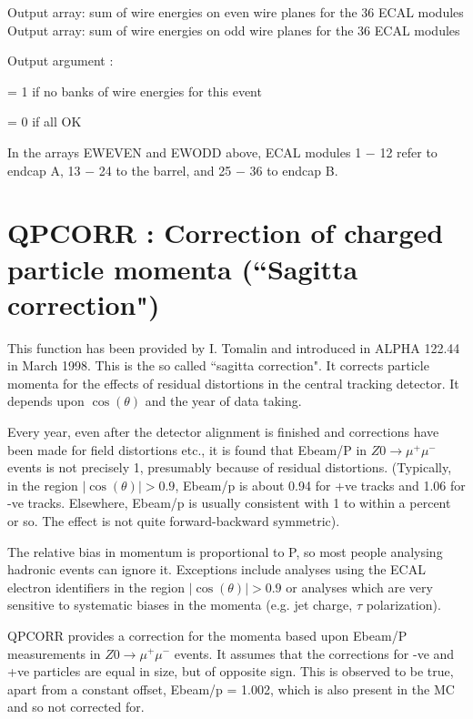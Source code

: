 \begin{indentlist}{ 3.50cm}{ 3.75cm}
     Output array:
      sum of wire energies on even wire planes for the 36 ECAL modules
        Output array: 
      sum of wire energies on odd  wire planes for the 36 ECAL modules 

     Output argument :   

= 1 if no banks of wire energies for this event

             = 0 if all OK
             
\end{indentlist}

      In the arrays EWEVEN and EWODD above, ECAL modules 1 $-$ 12 refer to endcap A, 13 $-$ 24 to the barrel, and 25
$-$ 36 to endcap B.

\par
\section{\label{sec-QPCOR}QPCORR : Correction of charged particle momenta (``Sagitta correction")}

     This function has been provided by I. Tomalin and introduced in ALPHA 122.44 in March 1998.
 This is the so called ``sagitta correction".
 It corrects particle momenta for the effects of residual distortions in
     the central tracking detector.
     It depends upon $\cos(\theta)$ and the year of data taking.
  
    Every year, even after the detector alignment is finished and
     corrections have been made for field distortions etc., it is found
     that Ebeam/P in $Z0 \rightarrow  \mu^+ \mu^-$ events is not precisely 1, presumably
     because of residual distortions.
     (Typically, in the region $|\cos(\theta)| > 0.9$, Ebeam/p is about 0.94
     for +ve tracks and 1.06 for -ve tracks. Elsewhere, Ebeam/p is usually
     consistent with 1 to within a percent or so. The effect is not quite
     forward-backward symmetric).

     The relative bias in momentum is proportional to P, so most people
     analysing hadronic events can ignore it. Exceptions include analyses
     using the ECAL electron identifiers in the region $|\cos(\theta)| > 0.9$
     or analyses which are very sensitive to systematic biases in the
     momenta (e.g. jet charge, $\tau$ polarization).
   
   QPCORR  provides a correction for the momenta based upon
     Ebeam/P measurements in $Z0 \rightarrow  \mu^+ \mu^-$ events. It assumes that the
     corrections for -ve and +ve particles are equal in size, but of
     opposite sign. This is observed to be true, apart from a constant
     offset, Ebeam/p = 1.002, which is also present in the MC and so not
     corrected for.

